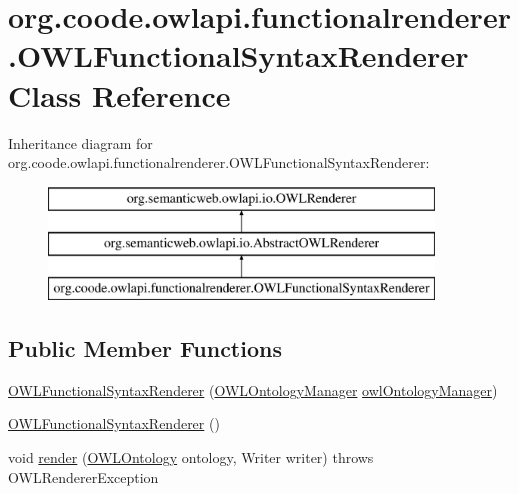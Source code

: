 \hypertarget{classorg_1_1coode_1_1owlapi_1_1functionalrenderer_1_1_o_w_l_functional_syntax_renderer}{\section{org.\-coode.\-owlapi.\-functionalrenderer.\-O\-W\-L\-Functional\-Syntax\-Renderer Class Reference}
\label{classorg_1_1coode_1_1owlapi_1_1functionalrenderer_1_1_o_w_l_functional_syntax_renderer}
}
Inheritance diagram for org.\-coode.\-owlapi.\-functionalrenderer.\-O\-W\-L\-Functional\-Syntax\-Renderer\-:\begin{figure}[H]
\begin{center}
\leavevmode
\includegraphics[height=3.000000cm]{classorg_1_1coode_1_1owlapi_1_1functionalrenderer_1_1_o_w_l_functional_syntax_renderer}
\end{center}
\end{figure}
\subsection*{Public Member Functions}
\begin{DoxyCompactItemize}
\item 
\hyperlink{classorg_1_1coode_1_1owlapi_1_1functionalrenderer_1_1_o_w_l_functional_syntax_renderer_a72a4177c7643cf0e3e3611ee2a6c26fc}{O\-W\-L\-Functional\-Syntax\-Renderer} (\hyperlink{interfaceorg_1_1semanticweb_1_1owlapi_1_1model_1_1_o_w_l_ontology_manager}{O\-W\-L\-Ontology\-Manager} \hyperlink{classorg_1_1semanticweb_1_1owlapi_1_1io_1_1_abstract_o_w_l_renderer_abb9888586f19a7a923cba542d99f1556}{owl\-Ontology\-Manager})
\item 
\hyperlink{classorg_1_1coode_1_1owlapi_1_1functionalrenderer_1_1_o_w_l_functional_syntax_renderer_a5c2559add2ab1a6bb794a12d67f4bdaf}{O\-W\-L\-Functional\-Syntax\-Renderer} ()
\item 
void \hyperlink{classorg_1_1coode_1_1owlapi_1_1functionalrenderer_1_1_o_w_l_functional_syntax_renderer_a14177c9d0fd4996ff53f0f27e9c59350}{render} (\hyperlink{interfaceorg_1_1semanticweb_1_1owlapi_1_1model_1_1_o_w_l_ontology}{O\-W\-L\-Ontology} ontology, Writer writer)  throws O\-W\-L\-Renderer\-Exception 
\end{DoxyCompactItemize}
